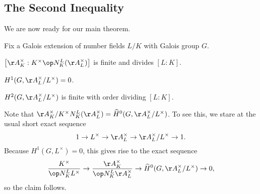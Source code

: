 \documentclass[../notes.tex]{subfiles}
\begin{document}
\subsection{The Second Inequality}
We are now ready for our main theorem.
\begin{theorem}
	Fix a Galois extension of number fields $L/K$ with Galois group $G$.
	\begin{listalph}
		\item $\left[\AA_K^\times:K^\times\op N^L_K(\AA_L^\times)\right]$ is finite and divides $[L:K]$.
		\item $H^1(G,\AA_L^\times/L^\times)=0$.
		\item $H^2(G,\AA_L^\times/L^\times)$ is finite with order dividing $[L:K]$.
	\end{listalph}
\end{theorem}
\begin{remark}
	Note that $\AA_K^\times/K^\times N^L_K(\AA_L^\times)=\widehat H^0(G,\AA_L^\times/L^\times)$. To see this, we stare at the usual short exact sequence
	\[1\to L^\times\to\AA_L^\times\to\AA_L^\times/L^\times\to1.\]
	Because $H^1(G,L^\times)=0$, this gives rise to the exact sequence
	\[\frac{K^\times}{\op N^L_KL^\times}\to\frac{\AA_K^\times}{\op N^L_K\AA_L^\times}\to\widehat H^0(G,\AA_L^\times/L^\times)\to0,\]
	so the claim follows.
\end{remark}
\end{document}
